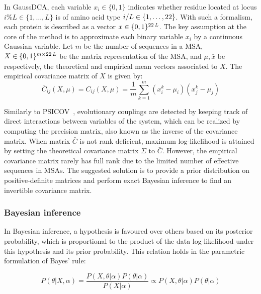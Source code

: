         In GaussDCA, each variable $x_i \in \{0, 1\}$ indicates whether residue located at locus $i \% L \in \{ 1, \dotsc, L \}$
        is of amino acid type $i / L \in \{1, \dotsc, 22\}$. With such a formalism, each protein is described as a vector
        $x \in \{0, 1\}^{22\,L}$. The key assumption at the core of the method is to approximate each binary variable $x_i$
        by a continuous Gaussian variable. Let $m$ be the number of sequences in a MSA, $X \in \{0, 1\}^{m \times 22\,L}$
        be the matrix representation of the MSA, and $\mu, \bar{x}$ be respectively, the theoretical and empirical mean vectors associated to $X$.
        The empirical covariance matrix of $X$ is given by:
        \begin{equation}
            \bar{C}_{ij}(X, \mu) = C_{ij}(X, \mu) = \frac{1}{m} \sum\limits_{k=1}^m (x_i^k - \mu_i) (x_j^k - \mu_j)
        \end{equation}

        Similarly to PSICOV~\cite{doi:10.1093/bioinformatics/btr638}, evolutionary couplings are detected by keeping track of direct interactions
        between variables of the system, which can be realized by computing the precision matrix, also known as the inverse of the covariance matrix.
        When matrix $\bar{C}$ is not rank deficient, maximum log-likelihood is attained by setting the theoretical covariance matrix
        $\Sigma$ to $\bar{C}$. However, the empirical covariance matrix rarely has full rank due to the limited number of effective sequences
        in MSAs. The suggested solution is to provide a prior distribution on positive-definite matrices and perform exact Bayesian inference
        to find an invertible covariance matrix.

        \subsubsection{Bayesian inference}

            In Bayesian inference, a hypothesis is favoured over others based on its posterior probability,
            which is proportional to the product of the data log-likelihood under this hypothesis
            and its prior probability. This relation holds in the parametric formulation of Bayes' rule:

            \begin{equation}
                P(\theta \vert X, \alpha) = \frac{P(X, \theta \vert \alpha) P(\theta \vert \alpha)}{P(X \vert \alpha)} \propto
                P(X, \theta \vert \alpha) P(\theta \vert \alpha)
            \end{equation}

